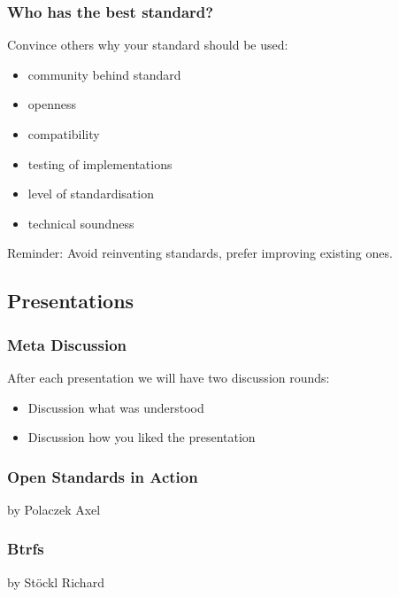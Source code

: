 
\begin{assignment}[label=best standard]
	\frametitle{Who has the best standard?}

	Convince others why your standard should be used:

	\begin{itemize}[<+-| alert@+>]
	\item community behind standard
	\item openness
	\item compatibility
	\item testing of implementations
	\item level of standardisation
	\item technical soundness
	\end{itemize}

	\pause[\thebeamerpauses]  %

	\begin{task}
	Reminder: Avoid reinventing standards, prefer improving existing ones.
	\end{task}
\end{assignment}

\subsection{Presentations}

\breakframe

\begin{frame}
	\frametitle{Meta Discussion}

	After each presentation we will have two discussion rounds:

	\begin{itemize}
	\item Discussion what was understood
	\item Discussion how you liked the presentation
	\end{itemize}
\end{frame}

\begin{frame}
	\frametitle{Open Standards in Action}

	by Polaczek Axel
\end{frame}

\begin{frame}
	\frametitle{Btrfs}

	by Stöckl Richard
\end{frame}

